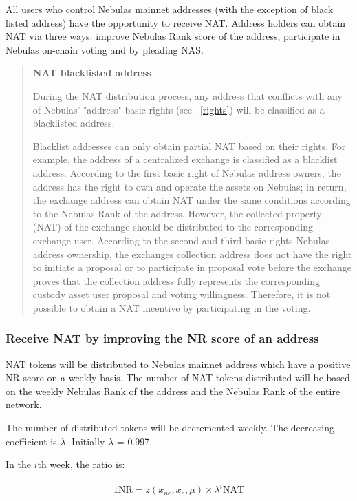 All users who control Nebulas mainnet addresses (with the exception of black listed address) have the opportunity to receive NAT. Address holders can obtain NAT via three ways: improve Nebulas Rank score of the address, participate in Nebulas on-chain voting and by pleading NAS.

\begin{quotation}

\textbf{NAT blacklisted address}

During the NAT distribution process, any address that conflicts with any of Nebulas' "address" basic rights (see ~\ref{rights}) will be classified as a blacklisted address. 

Blacklist addresses can only obtain partial NAT based on their rights. For example, the address of a centralized exchange is classified as a blacklist address. According to the first basic right of Nebulas address owners, the address has the right to own and operate the assets on Nebulas; in return, the exchange address  can obtain NAT under the same conditions according to the Nebulas Rank of the address. However, the collected property (NAT) of the exchange should be distributed to the corresponding exchange user. According to the second and third basic rights Nebulas address ownership, the exchanges collection address does not have the right to initiate a proposal or to participate in proposal vote before the exchange proves that the collection address fully represents the corresponding custody asset user proposal and voting willingness. Therefore, it is not possible to obtain a NAT incentive by participating in the voting.

\end{quotation}

\subsubsection{Receive NAT by improving the NR score of an address}

NAT tokens will be distributed to Nebulas mainnet address which have a positive NR score on a weekly basis. The number of NAT tokens distributed will be based on the weekly Nebulas Rank of the address and the Nebulas Rank of the entire network.

The number of distributed tokens will be decremented weekly. The decreasing coefficient is $\lambda$. Initially $\lambda$ = 0.997.

In the $i$th week, the ratio is:

\begin{align}
1 \text{NR}=z(x_{ne},x_{e},\mu)\times\lambda^{i} \text{NAT}
\end{align} 

